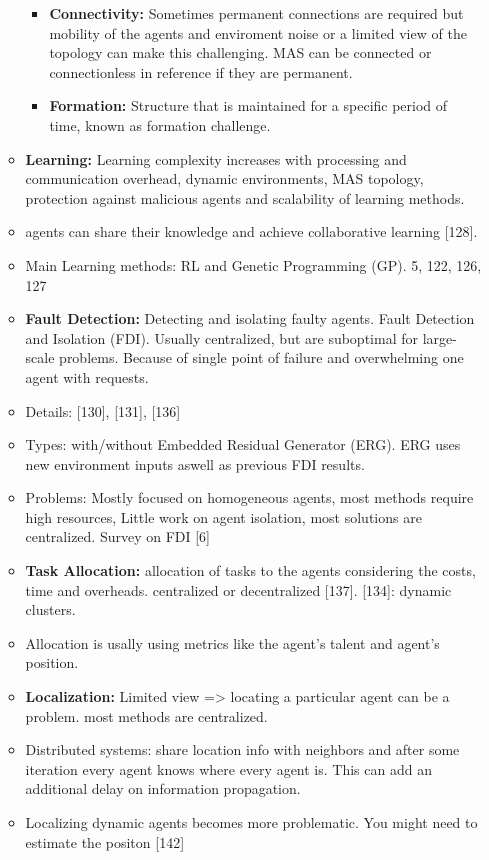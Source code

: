 \begin{itemize}
\begin{itemize}[noitemsep,nolistsep]
\begin{itemize}[noitemsep,nolistsep]
			\item \textbf{Connectivity:} Sometimes permanent connections are required but mobility of the agents and enviroment noise or a limited view of the topology can make this challenging. MAS can be connected or connectionless in reference if they are permanent.
			\item \textbf{Formation:} Structure that is maintained for a specific period of time, known as formation challenge.
		\end{itemize}
		\item \textbf{Learning:} Learning complexity increases with processing and communication overhead, dynamic environments, MAS topology, protection against malicious agents and scalability of learning methods.
		\item  agents can share their knowledge and achieve collaborative learning [128]. 
		\item Main Learning methods: RL and Genetic Programming (GP). 5, 122, 126, 127
		\item \textbf{Fault Detection:} Detecting and isolating faulty agents. Fault Detection and Isolation (FDI). Usually centralized, but are suboptimal for large-scale problems. Because of single point of failure and overwhelming one agent with requests.
		\item Details: [130], [131], [136]
		\item Types: with/without Embedded Residual Generator (ERG). ERG uses new environment inputs aswell as previous FDI results.
		\item Problems: Mostly focused on homogeneous agents, most methods require high resources, Little work on agent isolation, most solutions are centralized. Survey on FDI [6]
		\item \textbf{Task Allocation:} allocation of tasks to the agents considering the costs, time and overheads. centralized or decentralized [137]. [134]: dynamic clusters.
		\item Allocation is usally using metrics like the agent's talent and agent's position.
		\item \textbf{Localization:} Limited view => locating a particular agent can be a problem. most methods are centralized. 
		\item Distributed systems: share location info with neighbors and after some iteration every agent knows where every agent is. This can add an additional delay on information propagation.
		\item Localizing dynamic agents becomes more problematic. You might need to estimate the positon [142]

\end{itemize}
\end{itemize}
